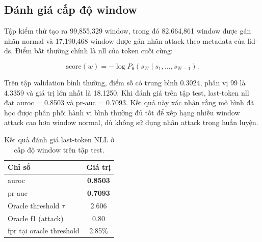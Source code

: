 \documentclass[../main.tex]{subfiles}
\begin{document}
\subsection{Đánh giá cấp độ window}
\label{subsec:p2_window_eval}

Tập kiểm thử tạo ra 99,855,329 window, trong đó 82,664,861 window
được gán nhãn normal
và 17,190,468 window được gán nhãn attack theo metadata của \gls{lid-ds}.
Điểm bất thường
chính là \gls{nll} của token cuối cùng:

\begin{equation}
  \label{eq:last_token_nll_ch5}
  \text{score}(w) = -\log P_\theta(s_W \mid s_1,\ldots,s_{W-1}).
\end{equation}

Trên tập validation bình thường, điểm số có trung bình 0.3024, phân
vị 99 là 4.3359
và giá trị lớn nhất là 18.1250. Khi đánh giá trên tập test, last-token \gls{nll} đạt
\gls{auroc} = 0.8503 và \gls{pr-auc} = 0.7093. Kết quả này xác nhận rằng mô hình đã học được
phân phối hành vi bình thường đủ tốt để xếp hạng nhiều window attack
cao hơn window
normal, dù không sử dụng nhãn attack trong huấn luyện.

\begin{table}[H]
  \caption{Kết quả đánh giá last-token NLL ở cấp độ window trên tập test.}
  \label{tab:p2_window_metrics}
  \centering
  \begin{tabular}{|l|c|}
    \hline
    \textbf{Chỉ số} & \textbf{Giá trị} \\ \hline
    \gls{auroc} & \textbf{0.8503} \\ \hline
    \gls{pr-auc} & \textbf{0.7093} \\ \hline
    Oracle threshold $\tau$ & 2.606 \\ \hline
    Oracle \gls{f1} (attack) & 0.80 \\ \hline
    \gls{fpr} tại oracle threshold & 2.85\% \\ \hline
  \end{tabular}
\end{table}
\end{document}
